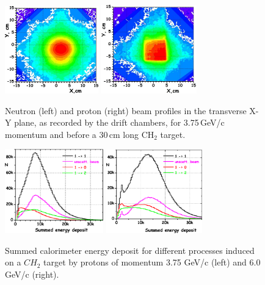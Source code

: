 \documentclass[twocolumn,epjc3]{svjour3}
\begin{document}
\begin{figure}
  \centering
  \includegraphics[width=0.36\textwidth]{fig08_n_beam_375.jpg}
  \includegraphics[width=0.37\textwidth]{fig08_p_beam_375.jpg}
  \caption{Neutron (left) and proton (right) beam profiles in the transverse X-Y plane, as recorded by the drift chambers, for 3.75\,GeV/c momentum and before a 30\,cm long CH$_{2}$ target.}
  \label{fig:BeamProfilesDriftChambers}
\end{figure}

\begin{figure}
  \centering
  \includegraphics[width=0.38\textwidth]{fig09_cal_375_CH2left.pdf}
  \includegraphics[width=0.37\textwidth]{fig09_cal_60_CH2right.pdf}
  \caption{Summed calorimeter energy deposit for different processes induced on a $CH_2$ target by protons of momentum 3.75 GeV/c (left) and 6.0 GeV/c (right).}
  \label{p_process}
\end{figure}
\end{document}
